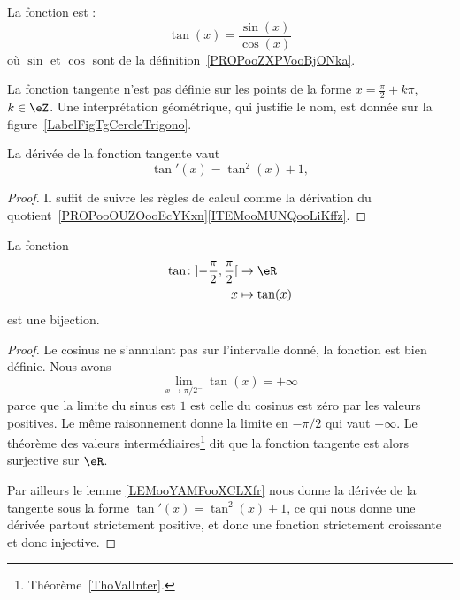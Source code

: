 \begin{definition}
	La fonction  est :
	\begin{equation}
		\tan(x)=\frac{ \sin(x) }{ \cos(x) }
	\end{equation}
	où \( \sin\) et \( \cos\) sont de la définition~\ref{PROPooZXPVooBjONka}.
\end{definition}
La fonction tangente n'est pas définie sur les points de la forme \( x=\frac{ \pi }{2}+k\pi\), \( k\in \eZ\). Une interprétation géométrique, qui justifie le nom, est donnée sur la figure~\ref{LabelFigTgCercleTrigono}.
\newcommand{\CaptionFigTgCercleTrigono}{Interprétation géométrique de la fonction tangente. La tangente de l'angle \( \theta\) est positive (et un peu plus grande que \( 1\)) tandis que celle de la tangente de l'angle \( \varphi\) est négative.}


\begin{lemma}		\label{LEMooYAMFooXCLXfr}
	La dérivée de la fonction tangente vaut
	\begin{equation}
		\tan'(x)=\tan^2(x)+1,
	\end{equation}
\end{lemma}

\begin{proof}
	Il suffit de suivre les règles de calcul comme la dérivation du quotient~\ref{PROPooOUZOooEcYKxn}\ref{ITEMooMUNQooLiKffz}.
\end{proof}

\begin{proposition}			\label{PROPooTLHUooPpqupE}
	La fonction
	\begin{equation}
		\begin{aligned}
			\tan\colon \mathopen] -\frac{ \pi }{ 2 } , \frac{ \pi }{2} \mathclose[ & \to \eR         \\
			x                                                                      & \mapsto \tan(x)
		\end{aligned}
	\end{equation}
	est une bijection.
\end{proposition}

\begin{proof}
	Le cosinus ne s'annulant pas sur l'intervalle donné, la fonction est bien définie. Nous avons
	\begin{equation}
		\lim_{x\to \pi/2^-} \tan(x)=+\infty
	\end{equation}
	parce que la limite du sinus est \( 1\) est celle du cosinus est zéro par les valeurs positives. Le même raisonnement donne la limite en \( -\pi/2\) qui vaut \( -\infty\). Le théorème des valeurs intermédiaires\footnote{Théorème~\ref{ThoValInter}.} dit que la fonction tangente est alors surjective sur \( \eR\).

	Par ailleurs le lemme \ref{LEMooYAMFooXCLXfr} nous donne la dérivée de la tangente sous la forme $\tan'(x)=\tan^2(x)+1$, ce qui nous donne une dérivée partout strictement positive, et donc une fonction strictement croissante et donc injective.
\end{proof}

